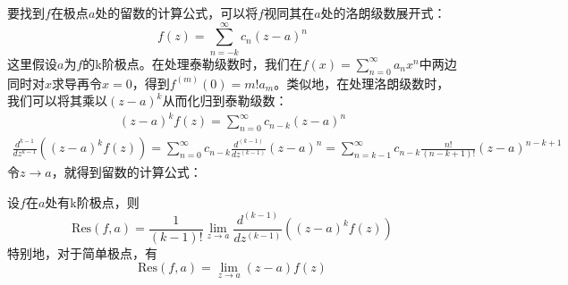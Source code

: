 要找到$f$在极点$a$处的留数的计算公式，可以将$f$视同其在$a$处的洛朗级数展开式：
\[f(z)=\sum_{n=-k}^{\infty}c_n(z-a)^n\]
这里假设$a$为$f$的k阶极点。在处理泰勒级数时，我们在$f(x)=\sum_{n=0}^{\infty}a_n x^n$中两边同时对$x$求导再令$x=0$，得到$f^{(m)}(0)=m!a_m$。类似地，在处理洛朗级数时，我们可以将其乘以$(z-a)^k$从而化归到泰勒级数：
\begin{align*}
    (z-a)^k f(z)=\sum_{n=0}^{\infty}c_{n-k}(z-a)^n
\end{align*}
\begin{align*}
    \frac{d^{k-1}}{dz^{k-1}}((z-a)^k f(z))=\sum_{n=0}^{\infty}c_{n-k}\frac{d^{(k-1)}}{dz^{(k-1)}}(z-a)^n=\sum_{n=k-1}^{\infty}c_{n-k}\frac{n!}{(n-k+1)!}(z-a)^{n-k+1}
\end{align*}
令$z\to a$，就得到留数的计算公式：\begin{proposition}
    设$f$在$a$处有k阶极点，则
    \[\mathrm{Res}(f,a)=\frac{1}{(k-1)!}\lim_{z\to a}\frac{d^{(k-1)}}{dz^{(k-1)}}((z-a)^k f(z))\]
    特别地，对于简单极点，有
    \[\mathrm{Res}(f,a)=\lim_{z\to a}(z-a)f(z)\]
\end{proposition}

